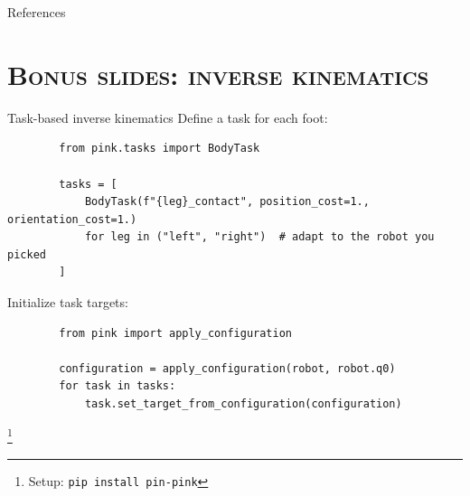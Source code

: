 \documentclass[9pt, aspectratio=43]{beamer}
\newcommand\blfootnote[1]{%
  \begingroup
  \renewcommand\thefootnote{}%
  \footnote{#1}%
  \addtocounter{footnote}{-1}%
  \endgroup
}
\begin{document}
\begin{frame}[allowframebreaks]{References}
    \printbibliography[heading=none]
\end{frame}


\section*{\textsc{Bonus slides: inverse kinematics}}


\begin{frame}[fragile]{Task-based inverse kinematics}
    Define a task for each foot:
    \begin{verbatim}
        from pink.tasks import BodyTask

        tasks = [
            BodyTask(f"{leg}_contact", position_cost=1., orientation_cost=1.)
            for leg in ("left", "right")  # adapt to the robot you picked
        ]
    \end{verbatim}
    Initialize task targets:
    \begin{verbatim}
        from pink import apply_configuration

        configuration = apply_configuration(robot, robot.q0)
        for task in tasks:
            task.set_target_from_configuration(configuration)
    \end{verbatim}
    \blfootnote{
        Setup: \texttt{pip install pin-pink}
    }
\end{frame}
\end{document}
